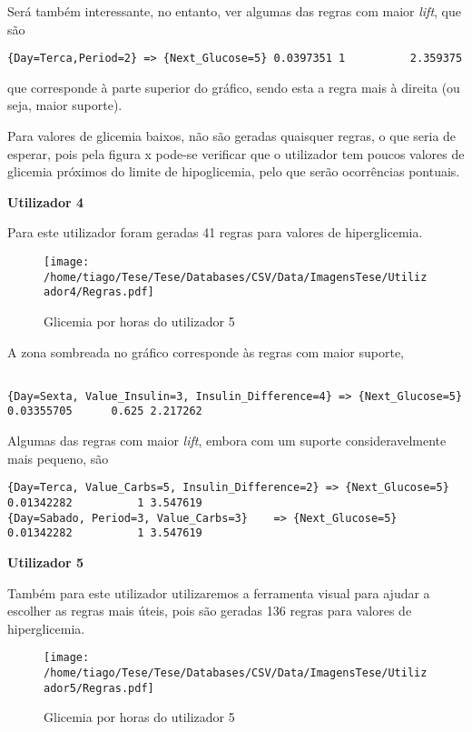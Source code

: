 Será também interessante, no entanto, ver algumas das regras com maior \textit{lift}, que são

\begin{lstlisting}
{Day=Terca,Period=2} => {Next_Glucose=5} 0.0397351 1          2.359375
\end{lstlisting}

que corresponde à parte superior do gráfico, sendo esta a regra mais à direita (ou seja, maior suporte). 

Para valores de glicemia baixos, não são geradas quaisquer regras, o que seria de esperar, pois pela figura x pode-se verificar que o utilizador tem poucos valores de glicemia próximos do limite de hipoglicemia, pelo que serão ocorrências pontuais. 


\textbf{Utilizador 4}

Para este utilizador foram geradas 41 regras para valores de hiperglicemia.



\begin{figure}[H]
\centering
\texttt{[image: /home/tiago/Tese/Tese/Databases/CSV/Data/ImagensTese/Utilizador4/Regras.pdf]}
\caption{Glicemia por horas do utilizador 5}
\end{figure}
 A zona sombreada no gráfico corresponde às regras com maior suporte,
 

\begin{lstlisting}

{Day=Sexta, Value_Insulin=3, Insulin_Difference=4} => {Next_Glucose=5} 0.03355705      0.625 2.217262

\end{lstlisting}

Algumas das regras com maior \textit{lift}, embora com um suporte consideravelmente mais pequeno, são

\begin{lstlisting}
{Day=Terca, Value_Carbs=5, Insulin_Difference=2} => {Next_Glucose=5} 0.01342282          1 3.547619
{Day=Sabado, Period=3, Value_Carbs=3}    => {Next_Glucose=5} 0.01342282          1 3.547619
\end{lstlisting}



\textbf{Utilizador 5}

Também para este utilizador utilizaremos a ferramenta visual para ajudar a escolher as regras mais úteis, pois são geradas 136 regras para valores de hiperglicemia. 

\begin{figure}[H]
\centering
\texttt{[image: /home/tiago/Tese/Tese/Databases/CSV/Data/ImagensTese/Utilizador5/Regras.pdf]}
\caption{Glicemia por horas do utilizador 5}
\end{figure}


